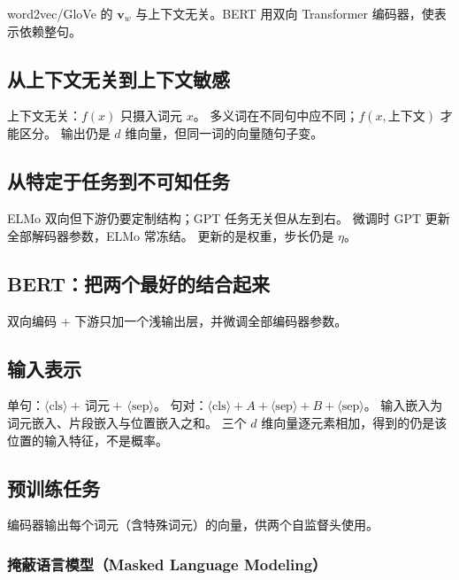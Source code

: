 

word2vec/GloVe 的 $\bm{v}_w$ 与上下文无关。BERT 用双向 Transformer 编码器，使表示依赖整句。

\subsection{从上下文无关到上下文敏感}

上下文无关：$f(x)$ 只摄入词元 $x$。
多义词在不同句中应不同；$f(x,\text{上下文})$ 才能区分。
输出仍是 $d$ 维向量，但同一词的向量随句子变。

\subsection{从特定于任务到不可知任务}

ELMo 双向但下游仍要定制结构；GPT 任务无关但从左到右。
微调时 GPT 更新全部解码器参数，ELMo 常冻结。
更新的是权重，步长仍是 $\eta$。

\subsection{BERT：把两个最好的结合起来}

双向编码 $+$ 下游只加一个浅输出层，并微调全部编码器参数。

\subsection{输入表示}

单句：$\langle\mathrm{cls}\rangle+\,\text{词元}+\,\langle\mathrm{sep}\rangle$。
句对：$\langle\mathrm{cls}\rangle+A+\langle\mathrm{sep}\rangle+B+\langle\mathrm{sep}\rangle$。
输入嵌入为词元嵌入、片段嵌入与位置嵌入之和。
三个 $d$ 维向量逐元素相加，得到的仍是该位置的输入特征，不是概率。

\subsection{预训练任务}

编码器输出每个词元（含特殊词元）的向量，供两个自监督头使用。

\subsubsection{掩蔽语言模型（Masked Language Modeling）}

